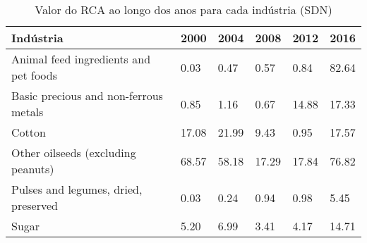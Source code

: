 \begin{table}
\centering
\caption{Valor do RCA ao longo dos anos para cada indústria (SDN)}
\label{tab:ex3-tempo-SDN}
\begin{tabular}{p{6cm}p{1.5cm}p{1.5cm}p{1.5cm}p{1.5cm}p{1.5cm}}
\toprule
                            Indústria &  2000 &  2004 &  2008 &  2012 &  2016 \\
\midrule
Animal feed ingredients and pet foods &  0.03 &  0.47 &  0.57 &  0.84 & 82.64 \\
Basic precious and non-ferrous metals &  0.85 &  1.16 &  0.67 & 14.88 & 17.33 \\
                               Cotton & 17.08 & 21.99 &  9.43 &  0.95 & 17.57 \\
   Other oilseeds (excluding peanuts) & 68.57 & 58.18 & 17.29 & 17.84 & 76.82 \\
 Pulses and legumes, dried, preserved &  0.03 &  0.24 &  0.94 &  0.98 &  5.45 \\
                                Sugar &  5.20 &  6.99 &  3.41 &  4.17 & 14.71 \\
\bottomrule
\end{tabular}
\end{table}
